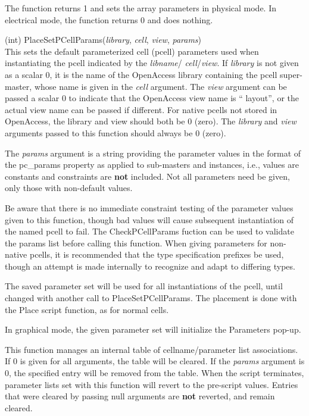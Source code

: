\begin{description}
The function returns 1 and sets the array parameters in physical mode. 
In electrical mode, the function returns 0 and does nothing.

\item{(int) \vt PlaceSetPCellParams({\it library\/}, {\it cell\/},
{\it view\/}, {\it params\/})}\\
This sets the default parameterized cell (pcell) parameters used when
instantiating the pcell indicated by the {\it libname\/}/{\it
cell\/}/{\it view\/}.
\ifoa
If {\it library} is not given as a scalar 0, it is the name of the
OpenAccess library containing the pcell super-master, whose name is
given in the {\it cell} argument.  The {\it view} argument can be
passed a scalar 0 to indicate that the OpenAccess view name is ``{\vt
layout}'', or the actual view name can be passed if different.  For
{\Xic} native pcells not stored in OpenAccess, the library and view
should both be 0 (zero).
\else
The {\it library} and {\it view} arguments passed to this function
should always be 0 (zero).
\fi

The {\it params} argument is a string providing the parameter values
in the format of the {\et pc\_params} property as applied to
sub-masters and instances, i.e., values are constants and constraints
are {\bf not} included.  Not all parameters need be given, only those
with non-default values.

Be aware that there is no immediate constraint testing of the
parameter values given to this function, though bad values will cause
subsequent instantiation of the named pcell to fail.  The {\vt
CheckPCellParams} fuction can be used to validate the params list
before calling this function.  When giving parameters for non-native
pcells, it is recommended that the type specification prefixes be
used, though an attempt is made internally to recognize and adapt to
differing types.

The saved parameter set will be used for all instantiations of the
pcell, until changed with another call to {\vt PlaceSetPCellParams}. 
The placement is done with the {\vt Place} script function, as for
normal cells.

In graphical mode, the given parameter set will initialize the {\cb
Parameters} pop-up.

This function manages an internal table of cellname/parameter list
associations.  If 0 is given for all arguments, the table will be
cleared.  If the {\it params} argument is 0, the specified entry will
be removed from the table.  When the script terminates, parameter
lists set with this function will revert to the pre-script values. 
Entries that were cleared by passing null arguments are {\bf not}
reverted, and remain cleared.


\end{description}
